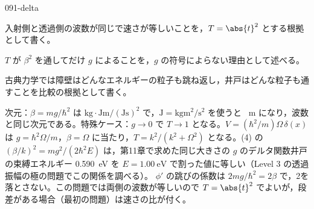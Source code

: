 \documentclass[uplatex,dvipdfmx,a4paper,11pt]{jsarticle}
\begin{document}
\begin{kaisetsu}{091-delta}
\begin{ronten}
  \item {} 入射側と透過側の波数が同じで速さが等しいことを，$T=\abs{t}^{2}$ とする根拠として書く。
  \item {} $T$ が $\beta^{2}$ を通してだけ $g$ によることを，$g$ の符号によらない理由として述べる。
  \item {} 古典力学では障壁はどんなエネルギーの粒子も跳ね返し，井戸はどんな粒子も通すことを比較の根拠として書く。
\end{ronten}
\kenzan 次元：$\beta=mg/\hbar^{2}$ は $\unit{\kilogram}\cdot\unit{\joule\metre}/(\unit{\joule\second})^{2}$ で，$\unit{\joule}=\unit{\kilogram\metre\squared\per\second\squared}$ を使うと \unit{\per\metre} になり，波数と同じ次元である。特殊ケース：$g\to 0$ で $T\to 1$ となる。$V=(\hbar^{2}/m)\Omega\,\delta(x)$ は $g=\hbar^{2}\Omega/m$，$\beta=\Omega$ に当たり，$T=k^{2}/(k^{2}+\Omega^{2})$ となる。(4) の $(\beta/k)^{2}=mg^{2}/(2\hbar^{2}E)$ は，第11章で求めた同じ大きさの $g$ のデルタ関数井戸の束縛エネルギー \qty{0.590}{\electronvolt} を $E=\qty{1.00}{\electronvolt}$ で割った値に等しい（Level 3 の透過振幅の極の問題でこの関係を調べる）。
\tsumazuki $\phi'$ の跳びの係数は $2mg/\hbar^{2}=2\beta$ で，2を落とさない。この問題では両側の波数が等しいので $T=\abs{t}^{2}$ でよいが，段差がある場合（最初の問題）は速さの比が付く。
\end{kaisetsu}
\end{document}
